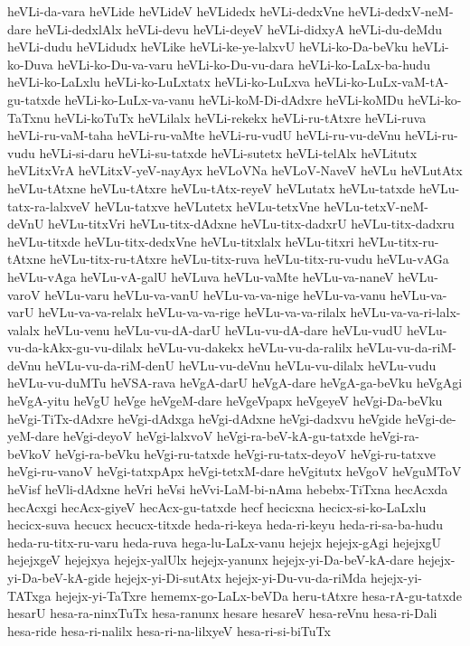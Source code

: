 {heVLi-da-vara
heVLide
heVLideV
heVLidedx
heVLi-dedxVne
heVLi-dedxV-neM-dare
heVLi-dedxlAlx
heVLi-devu
heVLi-deyeV
heVLi-didxyA
heVLi-du-deMdu
heVLi-dudu
heVLidudx
heVLike
heVLi-ke-ye-lalxvU
heVLi-ko-Da-beVku
heVLi-ko-Duva
heVLi-ko-Du-va-varu
heVLi-ko-Du-vu-dara
heVLi-ko-LaLx-ba-hudu
heVLi-ko-LaLxlu
heVLi-ko-LuLxtatx
heVLi-ko-LuLxva
heVLi-ko-LuLx-vaM-tA-gu-tatxde
heVLi-ko-LuLx-va-vanu
heVLi-koM-Di-dAdxre
heVLi-koMDu
heVLi-ko-TaTxnu
heVLi-koTuTx
heVLilalx
heVLi-rekekx
heVLi-ru-tAtxre
heVLi-ruva
heVLi-ru-vaM-taha
heVLi-ru-vaMte
heVLi-ru-vudU
heVLi-ru-vu-deVnu
heVLi-ru-vudu
heVLi-si-daru
heVLi-su-tatxde
heVLi-sutetx
heVLi-telAlx
heVLitutx
heVLitxVrA
heVLitxV-yeV-nayAyx
heVLoVNa
heVLoV-NaveV
heVLu
heVLutAtx
heVLu-tAtxne
heVLu-tAtxre
heVLu-tAtx-reyeV
heVLutatx
heVLu-tatxde
heVLu-tatx-ra-lalxveV
heVLu-tatxve
heVLutetx
heVLu-tetxVne
heVLu-tetxV-neM-deVnU
heVLu-titxVri
heVLu-titx-dAdxne
heVLu-titx-dadxrU
heVLu-titx-dadxru
heVLu-titxde
heVLu-titx-dedxVne
heVLu-titxlalx
heVLu-titxri
heVLu-titx-ru-tAtxne
heVLu-titx-ru-tAtxre
heVLu-titx-ruva
heVLu-titx-ru-vudu
heVLu-vAGa
heVLu-vAga
heVLu-vA-galU
heVLuva
heVLu-vaMte
heVLu-va-naneV
heVLu-varoV
heVLu-varu
heVLu-va-vanU
heVLu-va-va-nige
heVLu-va-vanu
heVLu-va-varU
heVLu-va-va-relalx
heVLu-va-va-rige
heVLu-va-va-rilalx
heVLu-va-va-ri-lalx-valalx
heVLu-venu
heVLu-vu-dA-darU
heVLu-vu-dA-dare
heVLu-vudU
heVLu-vu-da-kAkx-gu-vu-dilalx
heVLu-vu-dakekx
heVLu-vu-da-ralilx
heVLu-vu-da-riM-deVnu
heVLu-vu-da-riM-denU
heVLu-vu-deVnu
heVLu-vu-dilalx
heVLu-vudu
heVLu-vu-duMTu
heVSA-rava
heVgA-darU
heVgA-dare
heVgA-ga-beVku
heVgAgi
heVgA-yitu
heVgU
heVge
heVgeM-dare
heVgeVpapx
heVgeyeV
heVgi-Da-beVku
heVgi-TiTx-dAdxre
heVgi-dAdxga
heVgi-dAdxne
heVgi-dadxvu
heVgide
heVgi-de-yeM-dare
heVgi-deyoV
heVgi-lalxvoV
heVgi-ra-beV-kA-gu-tatxde
heVgi-ra-beVkoV
heVgi-ra-beVku
heVgi-ru-tatxde
heVgi-ru-tatx-deyoV
heVgi-ru-tatxve
heVgi-ru-vanoV
heVgi-tatxpApx
heVgi-tetxM-dare
heVgitutx
heVgoV
heVguMToV
heVisf
heVli-dAdxne
heVri
heVsi
heVvi-LaM-bi-nAma
hebebx-TiTxna
hecAcxda
hecAcxgi
hecAcx-giyeV
hecAcx-gu-tatxde
hecf
hecicxna
hecicx-si-ko-LaLxlu
hecicx-suva
hecucx
hecucx-titxde
heda-ri-keya
heda-ri-keyu
heda-ri-sa-ba-hudu
heda-ru-titx-ru-varu
heda-ruva
hega-lu-LaLx-vanu
hejejx
hejejx-gAgi
hejejxgU
hejejxgeV
hejejxya
hejejx-yalUlx
hejejx-yanunx
hejejx-yi-Da-beV-kA-dare
hejejx-yi-Da-beV-kA-gide
hejejx-yi-Di-sutAtx
hejejx-yi-Du-vu-da-riMda
hejejx-yi-TATxga
hejejx-yi-TaTxre
hememx-go-LaLx-beVDa
heru-tAtxre
hesa-rA-gu-tatxde
hesarU
hesa-ra-ninxTuTx
hesa-ranunx
hesare
hesareV
hesa-reVnu
hesa-ri-Dali
hesa-ride
hesa-ri-nalilx
hesa-ri-na-lilxyeV
hesa-ri-si-biTuTx
}
